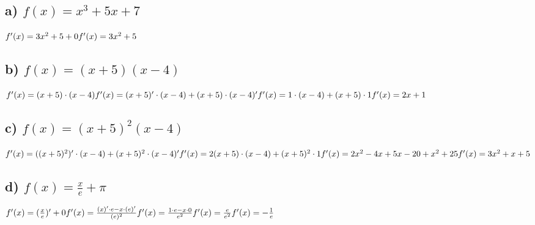 \documentclass{article}
\begin{document}
\subsection{a) $f(x) = x^3 + 5x + 7$}
$
f'(x) = 3x^2 + 5 + 0
\\
\\
f'(x) = 3x^2 + 5
$

\subsection{b) $f(x) = (x+5)(x-4)$}
$
f'(x) = (x+5) \cdot (x-4)
\\
\\
f'(x) = (x+5)' \cdot (x-4) + (x+5) \cdot (x-4)'
\\
\\
f'(x) = 1 \cdot (x-4) + (x+5) \cdot 1
\\
\\
f'(x) = 2x + 1
$

\subsection{c) $f(x) = (x+5)^2(x-4)$}
$
f'(x) = ((x+5)^2)' \cdot (x-4) + (x+5)^2 \cdot (x-4)'
\\
\\
f'(x) = 2(x+5) \cdot (x-4) + (x+5)^2 \cdot 1
\\
\\
f'(x) = 2x^2 - 4x + 5x - 20 + x^2 + 25
\\
\\
f'(x) = 3x^2 + x + 5
$

\pagebreak

\subsection{d) $f(x) = \frac{x}{e} + \pi $}
$
f'(x) = (\frac{x}{e})' + 0
\\
\\
f'(x) = \frac{(x)' \cdot e - x \cdot (e)'}{(e)^2}
\\
\\
f'(x) = \frac{1 \cdot e - x \cdot 0}{e^2}
\\
\\
f'(x) = \frac{e}{e^2}
\\
\\
f'(x) = - \frac{1}{e}
$
\end{document}
